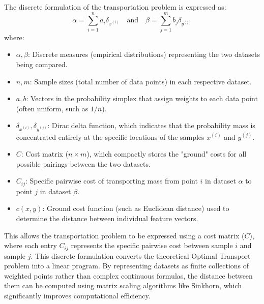 \documentclass[11pt, a4paper]{article}
\theoremstyle{plain} %
\theoremstyle{definition} %
\begin{document}
			The discrete formulation of the transportation problem is expressed as:
			\begin{equation}
				\label{eq:discrete_measure}
				\alpha = \sum_{i=1}^n a_i \delta_{x^{(i)}} \quad \text{and} \quad \beta = \sum_{j=1}^m b_j \delta_{y^{(j)}}
			\end{equation}
			where:
			\begin{itemize}
				\item \textbf{$\alpha, \beta$}: Discrete measures (empirical distributions) representing the two datasets being compared.
				\item \textbf{$n, m$}: Sample sizes (total number of data points) in each respective dataset.
				\item \textbf{$a, b$}: Vectors in the probability simplex that assign weights to each data point (often uniform, such as $1/n$).
				\item \textbf{$\delta_{x^{(i)}}, \delta_{y^{(j)}}$}: Dirac delta function, which indicates that the probability mass is concentrated entirely at the specific locations of the samples $x^{(i)}$ and $y^{(j)}$.
				\item \textbf{$C$}: Cost matrix ($n \times m$), which compactly stores the "ground" costs for all possible pairings between the two datasets.
				\item \textbf{$C_{ij}$}: Specific pairwise cost of transporting mass from point $i$ in dataset $\alpha$ to point $j$ in dataset $\beta$.
				\item \textbf{$c(x, y)$}: Ground cost function (such as Euclidean distance) used to determine the distance between individual feature vectors.
			\end{itemize}
			This allows the transportation problem to be expressed using a cost matrix ($C$), where each entry $C_{ij}$ represents the specific pairwise cost between sample $i$ and sample $j$. This discrete formulation converts the theoretical Optimal Transport problem into a linear program. By representing datasets as finite collections of weighted points rather than complex continuous formulas, the distance between them can be computed using matrix scaling algorithms like Sinkhorn, which significantly improves computational efficiency.
\end{document}
